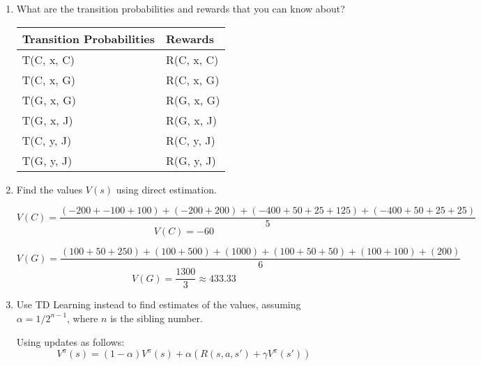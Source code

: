 \documentclass[12pt]{article}
\begin{document}
  \begin{enumerate}

  \item What are the transition probabilities and rewards that you can
    know about?

  \begin{center}
  \begin{tabular}{|l|l|} \hline
    \textbf{Transition Probabilities} & \textbf{Rewards} \\ \hline
    T(C, x, C) & R(C, x, C) \\
    T(C, x, G) & R(C, x, G) \\
    T(G, x, G) & R(G, x, G) \\
    T(G, x, J) & R(G, x, J) \\
    T(C, y, J) & R(C, y, J) \\
    T(G, y, J) & R(G, y, J) \\ \hline
  \end{tabular}
  \end{center}

  \item Find the values $V(s)$ using direct estimation.

  \[
    V(C) = \frac{(-200 + -100 + 100) + (-200 + 200) + (-400 + 50 + 25 + 125) + (-400 + 50 + 25 + 25)}{5}
  \]
  \[
    V(C) = -60
  \]

  \[
    V(G) = \frac{(100+50+250) + (100+500) + (1000) + (100 + 50 + 50) + (100 + 100) + (200)}{6}
  \]
  \[
    V(G) = \frac{1300}{3} \approx 433.33
  \]


  \item Use TD Learning instead to find estimates of the values,
    assuming $\alpha=1/2^{n-1}$, where $n$ is the sibling number.
  
  Using updates as follows: 
  \[
    V^\pi(s) = (1-\alpha) V^\pi(s) + \alpha (R(s, a, s') + \gamma V^\pi(s'))
  \]


\end{enumerate}
\end{document}
